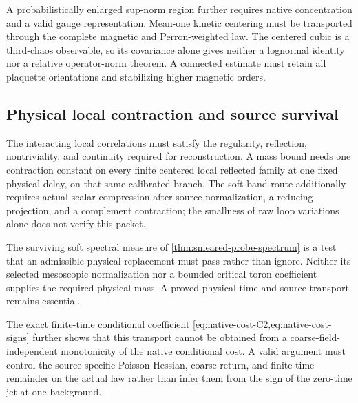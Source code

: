 \documentclass[11pt,oneside,openany]{book}
\theoremstyle{definition}
\theoremstyle{remark}
\begin{document}
A probabilistically enlarged sup-norm region further requires native
concentration and a valid gauge representation. Mean-one kinetic
centering must be transported through the complete magnetic and
Perron-weighted law. The centered cubic is a third-chaos observable,
so its covariance alone gives neither a lognormal identity nor a
relative operator-norm theorem. A connected estimate must retain
all plaquette orientations and stabilizing higher magnetic orders.

\subsection{Physical local contraction and source survival}
The interacting local correlations must satisfy the regularity,
reflection, nontriviality, and continuity required for reconstruction.
A mass bound needs one contraction constant on every finite centered
local reflected family at one fixed physical delay, on that same
calibrated branch. The soft-band route additionally requires actual
scalar compression after source normalization, a reducing projection,
and a complement contraction; the smallness of raw loop variations
alone does not verify this packet.

The surviving soft spectral measure of
\cref{thm:smeared-probe-spectrum} is a test that an admissible
physical replacement must pass rather than ignore. Neither its
selected mesoscopic normalization nor a bounded critical toron
coefficient supplies the required physical mass. A proved
physical-time and source transport remains essential.

The exact finite-time conditional coefficient
\cref{eq:native-cost-C2,eq:native-cost-signs} further shows that this
transport cannot be obtained from a coarse-field-independent
monotonicity of the native conditional cost.  A valid argument must
control the source-specific Poisson Hessian, coarse return, and
finite-time remainder on the actual law rather than infer them from
the sign of the zero-time jet at one background.
\end{document}
